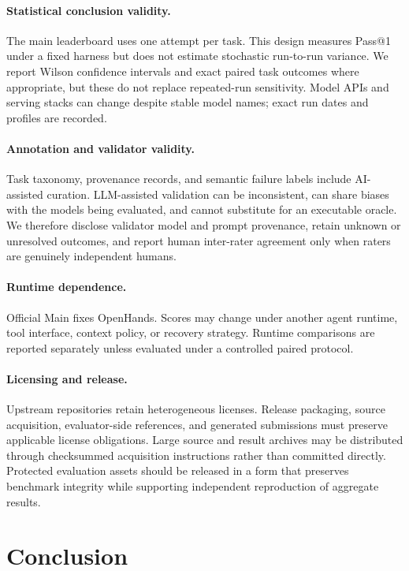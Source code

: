 \documentclass[acmsmall,screen,review,anonymous]{acmart}
\begin{document}
\paragraph{Statistical conclusion validity.}
The main leaderboard uses one attempt per task. This design measures Pass@1 under
a fixed harness but does not estimate stochastic run-to-run variance. We report
Wilson confidence intervals and exact paired task outcomes where appropriate, but
these do not replace repeated-run sensitivity. Model APIs and serving stacks can
change despite stable model names; exact run dates and profiles are recorded.

\paragraph{Annotation and validator validity.}
Task taxonomy, provenance records, and semantic failure labels include AI-assisted
curation. LLM-assisted validation can be inconsistent, can share biases with the
models being evaluated, and cannot substitute for an executable oracle. We
therefore disclose validator model and prompt provenance, retain unknown or
unresolved outcomes, and report human inter-rater agreement only when raters are
genuinely independent humans.

\paragraph{Runtime dependence.}
Official Main fixes OpenHands. Scores may change under another agent runtime, tool
interface, context policy, or recovery strategy. Runtime comparisons are reported
separately unless evaluated under a controlled paired protocol.

\paragraph{Licensing and release.}
Upstream repositories retain heterogeneous licenses. Release packaging, source
acquisition, evaluator-side references, and generated submissions must preserve
applicable license obligations. Large source and result archives may be distributed
through checksummed acquisition instructions rather than committed directly.
Protected evaluation assets should be released in a form that preserves benchmark
integrity while supporting independent reproduction of aggregate results.

\section{Conclusion}
\label{sec:conclusion}
\end{document}

